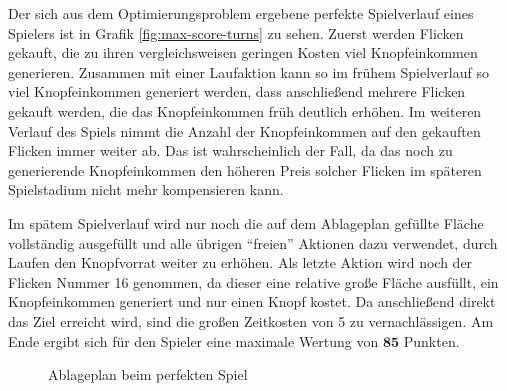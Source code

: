 Der sich aus dem Optimierungsproblem ergebene perfekte Spielverlauf eines Spielers ist in Grafik \ref{fig:max-score-turns} zu sehen. Zuerst werden Flicken gekauft, die zu ihren vergleichsweisen geringen Kosten viel Knopfeinkommen generieren. Zusammen mit einer Laufaktion kann so im frühem Spielverlauf so viel Knopfeinkommen generiert werden, dass anschließend mehrere Flicken gekauft werden, die das Knopfeinkommen früh deutlich erhöhen. Im weiteren Verlauf des Spiels nimmt die Anzahl der Knopfeinkommen auf den gekauften Flicken immer weiter ab. Das ist wahrscheinlich der Fall, da das noch zu generierende Knopfeinkommen den höheren Preis solcher Flicken im späteren Spielstadium nicht mehr kompensieren kann.

Im spätem Spielverlauf wird nur noch die auf dem Ablageplan gefüllte Fläche vollständig ausgefüllt und alle übrigen \enquote{freien} Aktionen dazu verwendet, durch Laufen den Knopfvorrat weiter zu erhöhen. Als letzte Aktion wird noch der Flicken Nummer 16 genommen, da dieser eine relative große Fläche ausfüllt, ein Knopfeinkommen generiert und nur einen Knopf kostet. Da anschließend direkt das Ziel erreicht wird, sind die großen Zeitkosten von 5 zu vernachlässigen. Am Ende ergibt sich für den Spieler eine maximale Wertung von $\boldsymbol{85}$ Punkten.

\begin{figure}
    \vspace*{-0.75cm}
    \centering
    \caption[Ablageplan beim perfekten Spiel]{\unskip}
    Ablageplan beim perfekten Spiel
    \label{fig:max-score-quilt-board}
    \vspace*{-0.75cm}
\end{figure}

